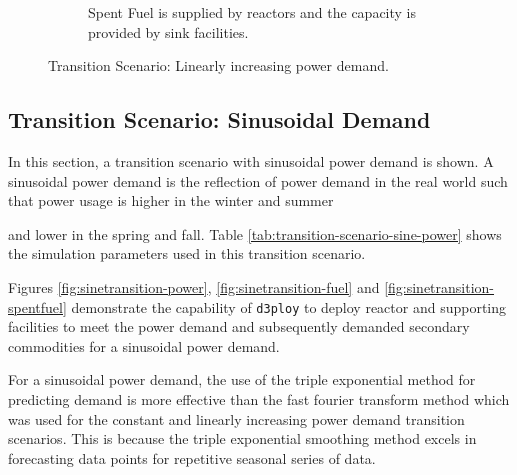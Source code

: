 \documentclass[11pt,letterpaper]{article}
\newcommand{\deploy}{\texttt{d3ploy}\xspace}%
\begin{document}
\begin{figure}[!htbp]
\begin{subfigure}[t]{0.65\textwidth}
        \caption{Spent Fuel is supplied by reactors and the capacity is provided by sink facilities.}
        \label{fig:growingtransition-spentfuel}
    \end{subfigure}
    \caption{Transition Scenario: Linearly increasing power demand.}
\end{figure}

\subsection{\textbf{Transition Scenario: Sinusoidal Demand}}
In this section, a transition scenario with sinusoidal
power demand is shown. 
A sinusoidal power demand is the reflection of power demand in 
the real world such that power usage is higher in the winter and summer

and lower in the spring and fall. 
Table \ref{tab:transition-scenario-sine-power} shows the 
simulation parameters used in this transition scenario. 

Figures \ref{fig:sinetransition-power}, \ref{fig:sinetransition-fuel}
and \ref{fig:sinetransition-spentfuel} demonstrate the capability 
of \deploy to deploy reactor and supporting facilities to meet the
power demand and subsequently demanded secondary commodities 
for a sinusoidal power demand. 

For a sinusoidal power demand, the use of the triple exponential method
for predicting demand is more effective than the 
fast fourier transform method which was used for the constant 
and linearly increasing power demand transition scenarios. 
This is because the triple exponential smoothing method excels in
forecasting data points for repetitive seasonal series of data.  
\end{document}
